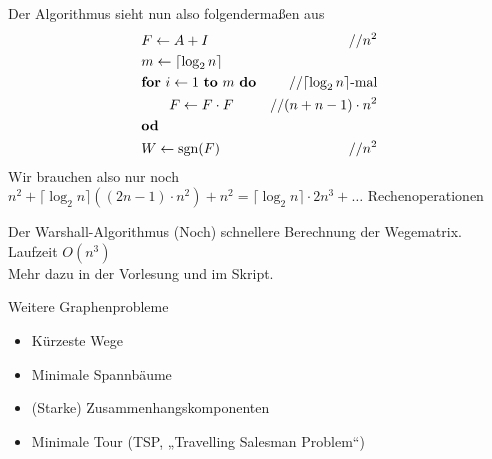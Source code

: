 \begin{frame}
	Der Algorithmus sieht nun also folgendermaßen aus 
	\begin{align*}
		&F \leftarrow A + I & // n^2 \\ 
		&m \leftarrow \lceil \log_2 n \rceil \\
		&\mathbf{for}\ i \leftarrow 1\ \mathbf{to} \ m \ \mathbf{do} & // \lceil \log_2 n \rceil\text{-mal} \\
		&\hspace*{2em} F \leftarrow F \cdot F & // (n+n-1)\cdot n^2 \\
		&\mathbf{od}\\
		& W\leftarrow \mathop{\text{sgn}}(F) 	& // n^2
	\end{align*} \pause
	Wir brauchen also nur noch $n^2 + \lceil \log_2 n \rceil \left( (2n-1)\cdot n^2 \right) +n^2 = \lceil \log_2 n \rceil \cdot 2n^3 + \dots $ Rechenoperationen  \\
\end{frame}

\begin{frame}{Der Warshall-Algorithmus}
	(Noch) schnellere Berechnung der Wegematrix. Laufzeit $O(n^3)$\\
	Mehr dazu in der Vorlesung und im Skript.
\end{frame}



\begin{frame}{Weitere Graphenprobleme}
	\begin{itemize}[<+->]
		\item Kürzeste Wege
		\item Minimale Spannbäume
		\item (Starke) Zusammenhangskomponenten
		\item Minimale Tour (TSP, „Travelling Salesman Problem“)
	\end{itemize}
	

\end{frame}

